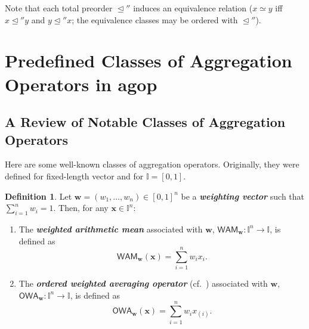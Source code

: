 \documentclass[11pt]{article}\usepackage[]{graphicx}\usepackage[]{color}
\newcommand{\hlkwd}[1]{\textcolor[rgb]{0.737,0.353,0.396}{\textbf{#1}}}%
\renewcommand{\emph}[1]{\textbf{\textsl{#1}}}
\newcommand{\package}[1]{\textsf{#1}\xspace}
\newcommand{\Rfunc}[1]{\texttt{\hlkwd{#1}}}
\newcommand{\vect}[1]{{\mathbf{#1}}}
\newcommand{\func}[1]{{\mathsf{#1}}}
\newcommand{\Ival}{\mathbb{I}}
\newcommand{\IvalPow}[1]{\mathbb{I}^{#1}}
\theoremstyle{remark}
\theoremstyle{definition}
\newtheorem{definition}[theorem]{Definition}
\begin{document}
Note that each total preorder $\trianglelefteq''$ induces an
equivalence relation ($x\simeq y$ iff $x\trianglelefteq''y$ and $y\trianglelefteq''x$;
the equivalence classes may be ordered with $\trianglelefteq''$).
%
%





\section{Predefined Classes of Aggregation Operators in \package{agop}}


\subsection{A Review of Notable Classes of Aggregation Operators}


Here are some well-known classes of aggregation operators.
Originally, they were defined for fixed-length vector
and for $\Ival=[0,1]$.


\begin{definition}
Let $\vect{w}=(w_{1},\dots,w_{n})\in[0,1]^{n}$ be a \emph{weighting vector}
such that $\sum_{i=1}^{n}w_{i}=1$. Then, for any $\vect{x}\in\IvalPow{n}$:

\begin{enumerate}
\item The \emph{weighted arithmetic mean} associated
with $\vect{w}$, $\func{WAM}_\vect{w}: \IvalPow{n}\to\Ival$,
 is defined as
\[\func{WAM}_\vect{w}(\vect{x})=\sum_{i=1}^{n}w_{i}x_{i}.\]

\item The \emph{ordered weighted averaging operator} (cf.~\cite{Yager1988:owa})
associated with $\vect{w}$,
$\func{OWA}_\vect{w}: \IvalPow{n}\to\Ival$,
 is defined as
\[\func{OWA}_\vect{w}(\vect{x})=\sum_{i=1}^{n}w_{i}x_{(i)}.\]
\end{enumerate}
\end{definition}
\end{document}
